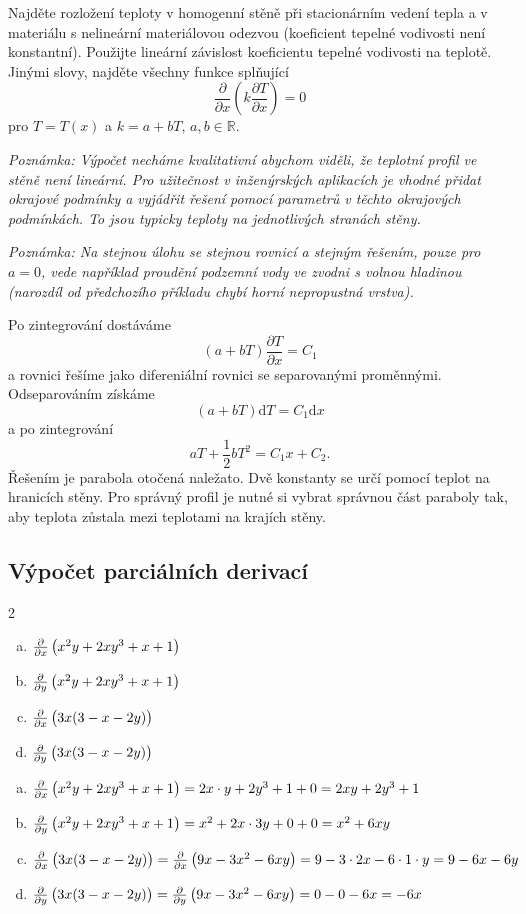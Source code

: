 Najděte rozložení teploty v homogenní stěně při stacionárním vedení
tepla a v materiálu s nelineární materiálovou odezvou (koeficient
tepelné vodivosti není konstantní).  Použijte lineární závislost
koeficientu tepelné vodivosti na teplotě.  Jinými slovy, najděte
všechny funkce splňující
$$\frac{\partial}{\partial x} \left(k \frac{\partial T}{\partial x}\right)=0$$
pro $T=T(x)$ a $k=a+bT$, $a,b\in \mathbb R$.

\textit{Poznámka: Výpočet necháme kvalitativní abychom viděli, že teplotní profil ve stěně není lineární. Pro užitečnost v inženýrských aplikacích je vhodné přidat okrajové podmínky a vyjádřit řešení pomocí parametrů v těchto okrajových podmínkách. To jsou typicky teploty na jednotlivých stranách stěny.}

\textit{Poznámka: Na stejnou úlohu se stejnou rovnicí a stejným řešením, pouze pro $a=0$, vede například proudění podzemní vody ve zvodni s volnou hladinou (narozdíl od předchozího příkladu chybí horní nepropustná vrstva).}

\reseni
Po zintegrování dostáváme
$$(a+bT)\frac{\partial T}{\partial x}=C_1$$
a rovnici řešíme jako difereniální rovnici se separovanými proměnnými.
Odseparováním získáme
$$(a+bT)\mathrm dT=C_1\mathrm dx$$
a po zintegrování
$$aT+\frac 12bT^2 = C_1x+C_2.$$
Řešením je
parabola otočená naležato. Dvě konstanty se určí pomocí teplot na hranicích stěny. Pro správný profil je nutné si vybrat
správnou část paraboly tak, aby teplota zůstala mezi teplotami na
krajích stěny.
\konec


\subsection{Výpočet  parciálních derivací}

\newcommand\pd[2][x]{\frac{\partial }{\partial #1}\left(\vphantom {\frac 22}#2\right)}
\begin{multicols}2
\begin{enumerate}[a)]
\item $\pd{x^2y+2xy^3+x+1}$
\item $\pd[y]{x^2y+2xy^3+x+1}$
\item $\pd{3x(3-x-2y)}$
\item $\pd[y]{3x(3-x-2y)}$
\end{enumerate}
\end{multicols}

\reseni
\begin{enumerate}[a)]
\item $\pd{x^2y+2xy^3+x+1}=2x\cdot y+2y^3+1+0=2xy+2y^3+1$
\item $\pd[y]{x^2y+2xy^3+x+1}=x^2+2x\cdot 3y+0+0=x^2+6xy$
\item $\pd{3x(3-x-2y)}=\pd{9x-3x^2-6xy}=9-3\cdot 2x-6\cdot 1\cdot y=9-6x-6y$
\item $\pd[y]{3x(3-x-2y)}=\pd[y]{9x-3x^2-6xy}=0-0-6x=-6x$
\end{enumerate}

